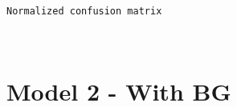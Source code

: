 \documentclass[11pt]{article}
\begin{document}
    \begin{Verbatim}[commandchars=\\\{\}]
Normalized confusion matrix

    \end{Verbatim}

    \begin{center}
    \end{center}
    { \hspace*{\fill} \\}
    
    \hypertarget{model-2---with-bg}{%
\section{Model 2 - With BG}\label{model-2---with-bg}}
\end{document}
